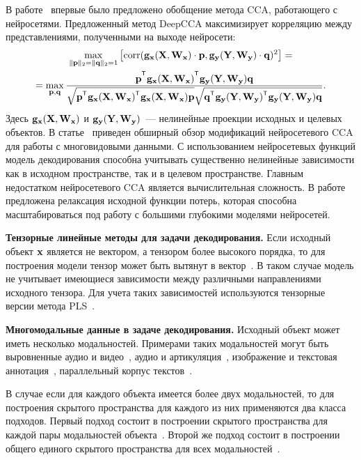 В работе~\cite{andrew2013deep} впервые было предложено обобщение метода CCA, работающего с нейросетями. 
Предложенный метод DeepCCA максимизирует корреляцию между представлениями, полученными на выходе нейросети:
\begin{multline}
	\max_{\|\bp\|_{2}=\|\bq\|_{2}=1}\left[ \text{corr}(\mathbf{g}_{\bx}(\bX, \bW_{\bx}) \cdot \bp, \mathbf{g}_{\by}(\bY, \bW_{\by}) \cdot \bq)^{2}\right] = \\ = \max_{\bp, \bq} \frac{\bp^{\T} \mathbf{g}_{\bx}(\bX, \bW_{\bx})^{\T} \mathbf{g}_{\by}(\bY, \bW_{\by}) \bq}{\sqrt{\bp^{\T} \mathbf{g}_{\bx}(\bX, \bW_{\bx})^{\T}  \mathbf{g}_{\bx}(\bX, \bW_{\bx}) \bp} \sqrt{\bq^{\T} \mathbf{g}_{\by}(\bY, \bW_{\by})^{\T}  \mathbf{g}_{\by}(\bY, \bW_{\by}) \bq}}.
	\label{ch1:eq:depp_cca_max_corr}
\end{multline}
Здесь $\mathbf{g}_{\mathbf{x}}(\mathbf{X}, \mathbf{W}_{\mathbf{x}})$ и $\mathbf{g}_{\mathbf{y}}(\mathbf{Y}, \mathbf{W}_{\mathbf{y}})$~--- нелинейные проекции исходных и целевых объектов.
В статье~\cite{wang2015deep} приведен обширный обзор модификаций нейросетевого CCA для работы с многовидовыми данными.
С использованием нейросетевых функций модель декодирования способна учитывать существенно нелинейные зависимости как в исходном пространстве, так и в целевом пространстве.
Главным недостатком нейросетевого CCA является вычислительная сложность. 
В работе~\cite{chang2018scalable} предложена релаксация исходной функции потерь, которая способна масштабироваться под работу с большими глубокими моделями нейросетей.

\vspace{0.5cm}
\textbf{Тензорные линейные методы для задачи декодирования.}
Если исходный объект $\mathbf{x}$ является не вектором, а тензором более высокого порядка, то для построения модели тензор может быть вытянут в вектор~\cite{cichocki2009nonnegative}. 
В таком случае модель не учитывает имеющиеся зависимости между различными направлениями исходного тензора.
Для учета таких зависимостей используются тензорные версии метода PLS~\cite{zhao2012higher,eliseyev2013recursive,eliseyev2016penalized}.


\vspace{0.5cm}
\textbf{Многомодальные данные в задаче декодирования.}
Исходный объект может иметь несколько модальностей. 
Примерами таких модальностей могут быть выровненные аудио и видео~\cite{kidron2005pixels,chaudhuri2009multi}, аудио и артикуляция~\cite{arora2012kernel}, изображение и текстовая аннотация~\cite{hardoon2004canonical,socher2010connecting,hodosh2013framing}, параллельный корпус текстов~\cite{vinokourov2003inferring,haghighi2008learning,ap2014autoencoder,faruqui2014improving}.

В случае если для каждого объекта имеется более двух модальностей, то для построения скрытого пространства для каждого из них применяются два класса подходов. 
Первый подход состоит в построении скрытого пространства для каждой пары модальностей объекта~\cite{masci2013multimodal,rajendran2015bridge}. 
Второй же подход состоит в построении общего единого скрытого пространства для всех модальностей~\cite{kumar2011co,sharma2012generalized}.